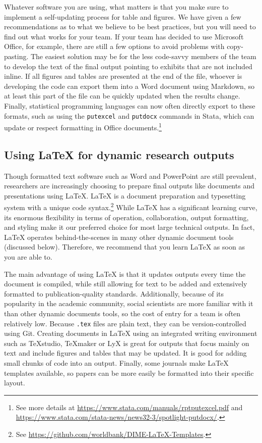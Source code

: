 \documentclass[
]{book}
\begin{document}
Whatever software you are using,
what matters is that you make sure to implement a self-updating process for table and figures.
We have given a few recommendations as to what we believe to be best practices,
but you will need to find out what works for your team.
If your team has decided to use Microsoft Office, for example,
there are still a few options to avoid problems with copy-pasting.
The easiest solution may be for the less code-savvy members of the team
to develop the text of the final output pointing to exhibits that are not included inline.
If all figures and tables are presented at the end of the file,
whoever is developing the code can export them into a Word document using Markdown,
so at least this part of the file can be quickly updated when the results change.
Finally, statistical programming languages can now often directly export to these formats,
such as using the \texttt{putexcel} and \texttt{putdocx} commands in Stata, which can update or respect formatting in Office documents.\footnote{See more details at
  \url{https://www.stata.com/manuals/rptputexcel.pdf}
  and \url{https://www.stata.com/stata-news/news32-3/spotlight-putdocx/}.}

\hypertarget{using-latex-for-dynamic-research-outputs}{%
\subsection*{Using LaTeX for dynamic research outputs}\label{using-latex-for-dynamic-research-outputs}}

Though formatted text software such as Word and PowerPoint are still prevalent,
researchers are increasingly choosing to prepare final outputs
like documents and presentations using LaTeX.
LaTeX is a document preparation and typesetting system with a unique code syntax.\footnote{See \url{https://github.com/worldbank/DIME-LaTeX-Templates}.}
While LaTeX has a significant learning curve,
its enormous flexibility in terms of operation, collaboration, output formatting, and styling
make it our preferred choice for most large technical outputs.
In fact, LaTeX operates behind-the-scenes in many other dynamic document tools (discussed below).
Therefore, we recommend that you learn LaTeX as soon as you are able to.

The main advantage of using LaTeX is that it updates outputs every time the document is compiled,
while still allowing for text to be added
and extensively formatted to publication-quality standards.
Additionally, because of its popularity in the academic community,
social scientists are more familiar with it than other dynamic documents tools,
so the cost of entry for a team is often relatively low.
Because \texttt{.tex} files are plain text,
they can be version-controlled using Git.
Creating documents in LaTeX using an integrated writing environment such as TeXstudio, TeXmaker or LyX
is great for outputs that focus mainly on text
and include figures and tables that may be updated.
It is good for adding small chunks of code into an output.
Finally, some journals make LaTeX templates available,
so papers can be more easily be formatted into their specific layout.
\end{document}

